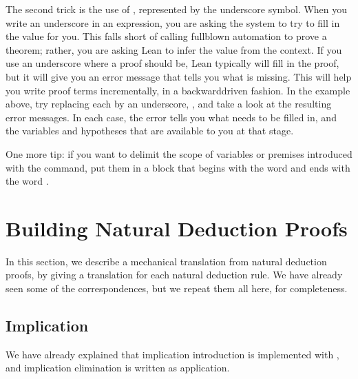 \documentclass[letterpaper,10pt,english]{sphinxmanual}
\begin{document}
\sphinxAtStartPar
The second trick is the use of ,
represented by the underscore symbol.
When you write an underscore in an expression,
you are asking the system to try to fill in the value for you.
This falls short of calling full\sphinxhyphen{}blown automation to prove a theorem;
rather, you are asking Lean to infer the value from the context.
If you use an underscore where a proof should be,
Lean typically will  fill in the proof,
but it will give you an error message that tells you what is missing.
This will help you write proof terms incrementally,
in a backward\sphinxhyphen{}driven fashion.
In the example above, try replacing each  by an underscore, \sphinxcode{\sphinxupquote{\_}},
and take a look at the resulting error messages.
In each case, the error tells you what needs to be filled in,
and the variables and hypotheses that are available to you at that stage.

\sphinxAtStartPar
One more tip: if you want to delimit the scope of variables or premises introduced with the  command, put them in a block that begins with the word  and ends with the word .


\section{Building Natural Deduction Proofs}
\label{\detokenize{propositional_logic_in_lean:building-natural-deduction-proofs}}
\sphinxAtStartPar
In this section, we describe a mechanical translation from natural deduction proofs, by giving a translation for each natural deduction rule. We have already seen some of the correspondences, but we repeat them all here, for completeness.


\subsection{Implication}
\label{\detokenize{propositional_logic_in_lean:implication}}
\sphinxAtStartPar
We have already explained that implication introduction is implemented with , and implication elimination is written as application.

\begin{sphinxVerbatim}[commandchars=\\\{\}]
    

     
    
   

        

     
\end{sphinxVerbatim}
\end{document}
